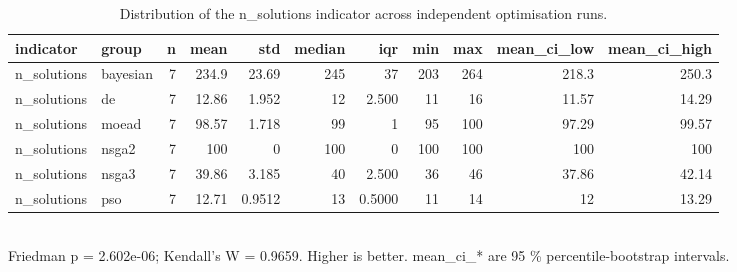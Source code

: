 \begin{table}[!t]
\centering
\caption{Distribution of the n_solutions indicator across independent optimisation runs.}
\label{tab:statistics_optimizer_n_solutions_main}
\footnotesize
\begin{tabular}{llrrrrrrrrr}
\toprule
indicator & group & n & mean & std & median & iqr & min & max & mean\_ci\_low & mean\_ci\_high \\
\midrule
n\_solutions & bayesian & 7 & 234.9 & 23.69 & 245 & 37 & 203 & 264 & 218.3 & 250.3 \\
n\_solutions & de & 7 & 12.86 & 1.952 & 12 & 2.500 & 11 & 16 & 11.57 & 14.29 \\
n\_solutions & moead & 7 & 98.57 & 1.718 & 99 & 1 & 95 & 100 & 97.29 & 99.57 \\
n\_solutions & nsga2 & 7 & 100 & 0 & 100 & 0 & 100 & 100 & 100 & 100 \\
n\_solutions & nsga3 & 7 & 39.86 & 3.185 & 40 & 2.500 & 36 & 46 & 37.86 & 42.14 \\
n\_solutions & pso & 7 & 12.71 & 0.9512 & 13 & 0.5000 & 11 & 14 & 12 & 13.29 \\
\bottomrule
\end{tabular}
\\[2pt] \footnotesize Friedman p = 2.602e-06; Kendall's W = 0.9659. Higher is better. mean\_ci\_* are 95 \% percentile-bootstrap intervals.
\end{table}
